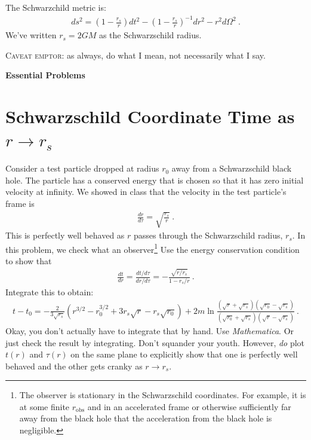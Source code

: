\documentclass[12pt]{article}
\numberwithin{equation}{section}    %
\begin{document}
\vspace{2em}

The Schwarzchild metric is:
\begin{align}
	ds^2 = \left(1-\frac{r_s}{r}\right)dt^2 
	- \left(1-\frac{r_s}{r}\right)^{-1}dr^2
	- r^2 d\Omega^2 \ .
\end{align}
We've written $r_s = 2GM$ as the Schwarzschild radius.


\textsc{Caveat emptor}: as always, do what I mean, not necessarily what I say.


\vspace{2em}
{\Large\textbf{\textsf{Essential Problems}}}

\section{Schwarzschild Coordinate Time as $r\to r_s$}


Consider a test particle dropped at radius $r_0$ away from a Schwarzschild black hole. The particle has a conserved energy that is chosen so that it has zero initial velocity at infinity. We showed in class that the velocity in the test particle's frame is
\begin{align}
	\frac{dr}{d\tau} = \sqrt{\frac{r_s}{r}} \ .
\end{align}
This is perfectly well behaved as $r$ passes through the Schwarzschild radius, $r_s$. In this problem, we check what an observer\footnote{The observer is stationary in the Schwarzschild coordinates. For example, it is at some finite $r_\text{obs}$ and in an accelerated frame or otherwise sufficiently far away from the black hole that the acceleration from the black hole is negligible.} Use the energy conservation condition to show that
\begin{align}
	\frac{dt}{dr} = \frac{dt/d\tau}{dr/d\tau} = 
	-  \frac{\sqrt{r/r_s}}{1-r_s/r} \ .
\end{align}
Integrate this to obtain:
\begin{align}
	t-t_0 = -\frac{2}{3\sqrt{r_s}} \left(
		r^{3/2} - r_0^{3/2} + 3r_s\sqrt{r} - r_s\sqrt{r_0}
	\right)
	+ 2m \ln \frac{
	\left(\sqrt{r}+\sqrt{r_s}\right)
	\left(\sqrt{r_0}-\sqrt{r_s}\right)
	}{
	\left(\sqrt{r_0}+\sqrt{r_s}\right)
	\left(\sqrt{r}-\sqrt{r_s}\right)
	} \ .
\end{align}
Okay, you don't actually have to integrate that by hand. Use \emph{Mathematica}. Or just check the result by integrating. Don't squander your youth. However, \emph{do} plot $t(r)$ and $\tau(r)$ on the same plane to explicitly show that one is perfectly well behaved and the other gets cranky as $r\to r_s$. 
\end{document}
